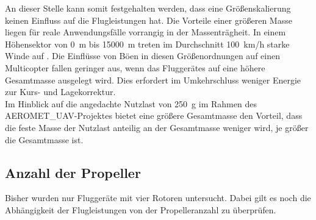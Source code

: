 An dieser Stelle kann somit festgehalten werden, dass eine Größenskalierung keinen Einfluss auf die Flugleistungen hat. Die Vorteile einer größeren Masse liegen für reale Anwendungsfälle vorrangig in der Massenträgheit. In einem Höhensektor von \SI{0}{m} bis \SI{15000}{m} treten im Durchschnitt \SI{100}{km/h} starke Winde auf \cite{Seidel.2011}. Die Einflüsse von Böen in diesen Größenordnungen auf einen Multicopter fallen geringer aus, wenn das Fluggerätes auf eine höhere Gesamtmasse ausgelegt wird. Dies erfordert im Umkehrschluss weniger Energie zur Kurs- und Lagekorrektur. \\
Im Hinblick auf die angedachte Nutzlast von \SI{250}{g} im Rahmen des AEROMET\_UAV-Projektes bietet eine größere Gesamtmasse den Vorteil, dass die feste Masse der Nutzlast anteilig an der Gesamtmasse weniger wird, je größer die Gesamtmasse ist.


\subsection{Anzahl der Propeller}
\label{subsec:anz_prop}
Bisher wurden nur Fluggeräte mit vier Rotoren untersucht. Dabei gilt es noch die Abhängigkeit der Flugleistungen von der Propelleranzahl zu überprüfen. 

